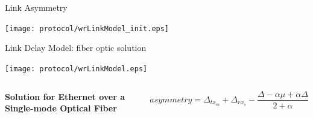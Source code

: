 \documentclass[compress,red]{beamer}
\begin{document}
\begin{frame}{Link Asymmetry}

  \begin{center}
  \texttt{[image: protocol/wrLinkModel\_init.eps]}
  \end{center}

\end{frame}
\begin{frame}{Link Delay Model: fiber optic solution}

  \begin{center}
  \texttt{[image: protocol/wrLinkModel.eps]}
  \end{center}

  \begin{columns}[c]
  \column{1.5in}

    \begin{center}
      \textbf{Solution for Ethernet over a Single-mode Optical Fiber}
    \end{center}    

  \column{2.7in}

    \begin{equation}
      \nonumber asymmetry = \Delta_{tx_m} + \Delta_{rx_s} - \frac{\Delta - \alpha \mu + \alpha \Delta}{2 + \alpha}
    \end{equation}

  \end{columns}

\end{frame}
\end{document}
